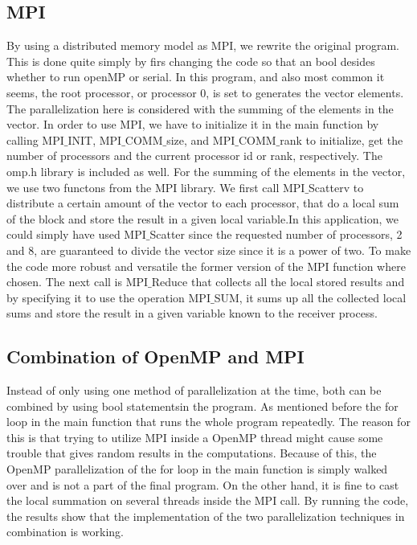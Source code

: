 \documentclass[12p]{article}
\begin{document}
\subsection{MPI}
By using a distributed memory model as MPI, we rewrite the original program. This is done quite simply by firs changing the code so that an bool desides whether to run openMP or serial. In this program, and also most common it seems, the root processor, or processor 0, is set to generates the vector elements. The parallelization here is considered with the summing of the elements in the vector. In order to use MPI, we have to initialize it in the main function by calling MPI$\_$INIT, MPI$\_$COMM$\_$size, and MPI$\_$COMM$\_$rank to initialize, get the number of processors and the current processor id or rank, respectively. The omp.h library is included as well. For the summing of the elements in the vector, we use two functons from the MPI library. We first call MPI$\_$Scatterv to distribute a certain amount of the vector to each processor,
that do a local sum of the block and store the result in a given local variable.In this application, we could simply have used MPI$\_$Scatter since the requested number of processors, 2 and 8, are guaranteed to divide the vector size since it is a power of two. To make the code more robust and versatile the former version of the MPI function where chosen. The next call is MPI$\_$Reduce that collects all the local stored results and by specifying it to use the operation MPI$\_$SUM, it sums up all the collected local sums and store the result in a given variable known to the receiver process.

\subsection{Combination of OpenMP and MPI}
Instead of only using one method of parallelization at the time, both can be combined by using bool statementsin the program. As mentioned before the for loop in  the main function that runs the whole program repeatedly. The reason for this is that trying to utilize MPI inside a OpenMP thread might cause some trouble that gives random results in the computations. Because of this, the OpenMP parallelization of the for loop in the main function is simply walked over and is not a part of the final program. On the other hand, it is fine to cast the local summation on several threads inside the MPI call. By running the code, the results show that the implementation of the two parallelization techniques in combination is working. 
\end{document}
